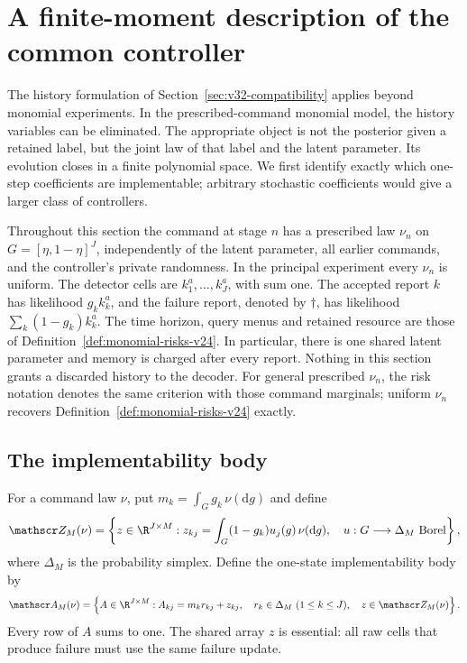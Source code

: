 \section{A finite-moment description of the common controller}
\label{sec:v33-moments}

The history formulation of Section~\ref{sec:v32-compatibility} applies
beyond monomial experiments. In the prescribed-command monomial model,
the history variables can be eliminated. The appropriate object is not
the posterior given a retained label, but the joint law of that label
and the latent parameter. Its evolution closes in a finite polynomial
space. We first identify exactly which one-step coefficients are
implementable; arbitrary stochastic coefficients would give a larger
class of controllers.

Throughout this section the command at stage $n$ has a prescribed law
$\nu_n$ on $G=[\eta,1-\eta]^J$, independently of the latent parameter,
all earlier commands, and the controller's private randomness. In the
principal experiment every $\nu_n$ is uniform. The detector cells are
$k_1^a,\ldots,k_J^a$, with sum one. The accepted report $k$ has likelihood
$g_k k_k^a$, and the failure report, denoted by $\dagger$, has likelihood
$\sum_k(1-g_k)k_k^a$. The time horizon, query menus and retained resource
are those of Definition~\ref{def:monomial-risks-v24}. In particular,
there is one shared latent parameter and memory is charged after every
report. Nothing in this section grants a discarded history to the decoder.
For general prescribed $\nu_n$, the risk notation denotes the same
criterion with those command marginals; uniform $\nu_n$ recovers
Definition~\ref{def:monomial-risks-v24} exactly.

\subsection{The implementability body}
For a command law $\nu$, put $m_k=\int_G g_k\,\nu(\mathrm dg)$ and define
\begin{equation}\label{eq:v33-allocation}
 \mathscr Z_M(\nu)=\left\{z\in\R^{J\times M}:
 z_{kj}=\int_G(1-g_k)u_j(g)\,\nu(\mathrm dg),\quad
 u:G\longrightarrow\Delta_M\ \hbox{Borel}\right\},
\end{equation}
where $\Delta_M$ is the probability simplex. Define the one-state
implementability body by
\begin{equation}\label{eq:v33-body}
 \mathscr A_M(\nu)=
 \left\{ A\in\R^{J\times M}: A_{kj}=m_k r_{kj}+z_{kj},\quad
       r_k\in\Delta_M\ (1\le k\le J),\quad z\in\mathscr Z_M(\nu)\right\}.
\end{equation}
Every row of $A$ sums to one. The shared array $z$ is essential: all
raw cells that produce failure must use the same failure update.

